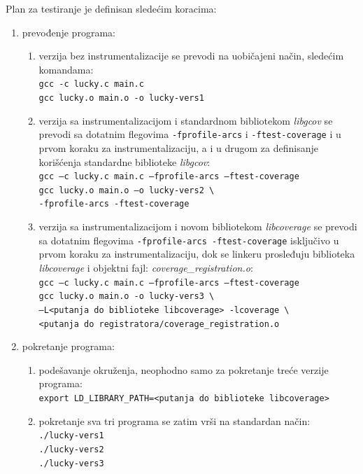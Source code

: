 \documentclass[12pt,oneside]{memoir}
\newcommand{\kod}[1]{\texttt{#1}}
\newcommand{\strano}[1]{\textit{#1}}
\begin{document}
Plan za testiranje je definisan sledećim koracima:
\begin{enumerate}

\item prevođenje programa:
\begin{enumerate}
\item verzija bez instrumentalizacije se prevodi na uobičajeni način, sledećim komandama: \\
\kod{gcc -c lucky.c main.c} \\
\kod{gcc lucky.o main.o -o lucky-vers1}
\item verzija sa instrumentalizacijom i standardnom bibliotekom \strano{libgcov} se prevodi sa dotatnim flegovima \kod{-fprofile-arcs} i \kod{-ftest-coverage} i u prvom koraku za instrumentalizaciju, a i u drugom za definisanje korišćenja standardne biblioteke \strano{libgcov}: \\
\kod{gcc –c lucky.c main.c –fprofile-arcs –ftest-coverage} \\
\kod{gcc lucky.o main.o –o lucky-vers2 \textbackslash} \\
\hspace*{6mm} \kod{-fprofile-arcs -ftest-coverage}
\item verzija sa instrumentalizacijom i novom bibliotekom \strano{libcoverage} se prevodi sa dotatnim flegovima \kod{-fprofile-arcs -ftest-coverage} isključivo u prvom koraku za instrumentalizaciju, dok se linkeru prosleđuju biblioteka \strano{libcoverage} i objektni fajl: \strano{coverage\_registration.o}: \\
\kod{gcc –c lucky.c main.c –fprofile-arcs –ftest-coverage} \\
\kod{gcc lucky.o main.o -o lucky-vers3 \textbackslash} \\ \hspace*{6mm} \kod{–L<putanja do biblioteke libcoverage> -lcoverage \textbackslash} \\
\hspace*{6mm} \kod{<putanja do registratora/coverage\_registration.o}
\end{enumerate}

\item pokretanje programa:
\begin{enumerate}
\item podešavanje okruženja, neophodno samo za pokretanje treće verzije programa: \\
\kod{export LD\_LIBRARY\_PATH=<putanja do biblioteke libcoverage>}
\item pokretanje sva tri programa se zatim vrši na standardan način: \\
\kod{./lucky-vers1} \\
\kod{./lucky-vers2} \\
\kod{./lucky-vers3} \\
\end{enumerate}


\end{enumerate}
\end{document}

